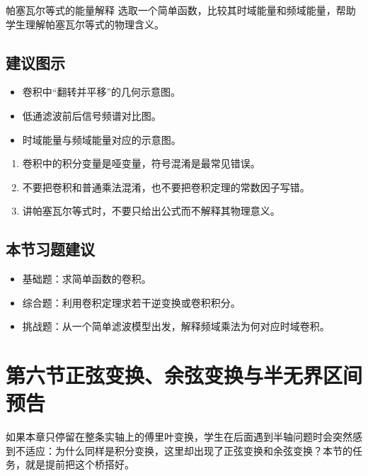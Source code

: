 \begin{lizi}{帕塞瓦尔等式的能量解释}{}
选取一个简单函数，比较其时域能量和频域能量，帮助学生理解帕塞瓦尔等式的物理含义。
\end{lizi}

\subsection*{建议图示}
\begin{itemize}
    \item 卷积中``翻转并平移''的几何示意图。
    \item 低通滤波前后信号频谱对比图。
    \item 时域能量与频域能量对应的示意图。
\end{itemize}

\begin{jinshi}[本节易错点]
\begin{enumerate}
    \item 卷积中的积分变量是哑变量，符号混淆是最常见错误。
    \item 不要把卷积和普通乘法混淆，也不要把卷积定理的常数因子写错。
    \item 讲帕塞瓦尔等式时，不要只给出公式而不解释其物理意义。
\end{enumerate}
\end{jinshi}

\subsection*{本节习题建议}
\begin{itemize}
    \item 基础题：求简单函数的卷积。
    \item 综合题：利用卷积定理求若干逆变换或卷积积分。
    \item 挑战题：从一个简单滤波模型出发，解释频域乘法为何对应时域卷积。
\end{itemize}

\section{第六节\quad 正弦变换、余弦变换与半无界区间预告}

\begin{wulibj}[本节要解决的问题]
如果本章只停留在整条实轴上的傅里叶变换，学生在后面遇到半轴问题时会突然感到不适应：为什么同样是积分变换，这里却出现了正弦变换和余弦变换？本节的任务，就是提前把这个桥搭好。
\end{wulibj}

